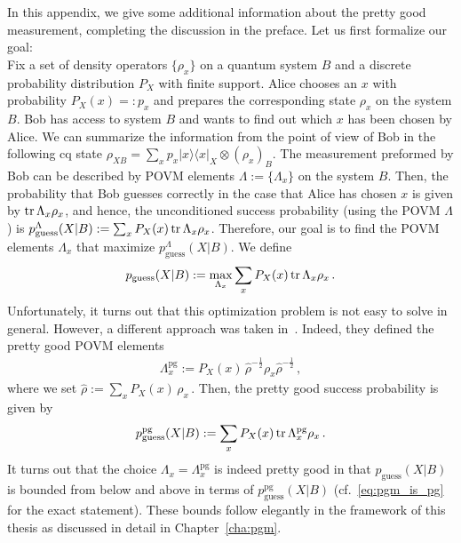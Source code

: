\documentclass[11pt,a4paper,twoside]{report}
\newcommand{\ketbra}[1]{|#1\rangle\langle #1|}
\newcommand{\+}{\textnormal{+} }
\def\tr{{\rm tr}}
\theoremstyle{definition}
\numberwithin{equation}{chapter}
\begin{document}
\begin{appendix}
In this appendix, we give some additional information about the pretty good measurement, completing the discussion in the preface. Let us first formalize our goal: \\
Fix a set of density operators $\{\rho_x\}$ on a quantum system $B$ and a discrete probability distribution $P_X$ with finite support. Alice chooses an $x$ with probability  $P_X(x)=:p_x$ and prepares the corresponding state $\rho_x$ on the system $B$. Bob has access to system $B$ and wants to find out which $x$ has been chosen by Alice. We can summarize the information from the point of view of Bob in the following cq state $\rho_{XB}=\sum_{x} p_x \ketbra{x}_X \otimes (\rho_x)_B$. The measurement preformed by Bob can be described by POVM elements $\Lambda:=\{\Lambda_x\}$ on the system $B$. Then, the probability that Bob guesses correctly in the case that Alice has chosen $x$ is given by $\tr \, \Lambda_x \rho_x$, and hence, the unconditioned success probability (using the POVM $\Lambda$) is $p^{\Lambda}_{\text{guess}}(X|B):=\sum_{x} P_X(x) \, \tr \, \Lambda_x \rho_x$. Therefore, our goal is to find the POVM elements $\Lambda_x$ that maximize $p^{\Lambda}_{\text{guess}}(X|B)$. We define
\begin{align}
p_{\text{guess}}(X|B):= \underset{\Lambda_x}{\max} \sum_{x} P_X(x) \, \tr \, \Lambda_x \rho_x \,.
\end{align}
Unfortunately, it turns out that this optimization problem is not easy to solve in general. However, a different approach was taken in~\cite{belavkin_optimal_1975, hausladen_`pretty_1994}. Indeed,  they defined the pretty good POVM elements 
\begin{align}
\Lambda^{\text{pg}}_x:=P_X(x) \, \hat{\rho}^{-\frac{1}{2}} \rho_x \hat{\rho}^{-\frac{1}{2}} \, ,
\end{align}
where we set $ \hat{\rho}:= \sum_{x} P_X(x) \, \rho_x\,$. Then, the pretty good success probability is given by 
\begin{align}
p^{\text{pg}}_{\text{guess}}(X|B):=\sum_{x} P_X(x) \, \tr \, \Lambda^{\text{pg}}_x \rho_x \, .  
\end{align}
It turns out that the choice $\Lambda_x=\Lambda^{\text{pg}}_x$ is indeed pretty good in that $p_{\text{guess}}(X|B)$ is bounded from below and above in terms of $p^{\text{pg}}_{\text{guess}}(X|B)$ (cf.~\eqref{eq:pgm_is_pg} for the exact statement). These bounds follow elegantly in the framework of this thesis as discussed in detail in Chapter~\ref{cha:pgm}.



\end{appendix}
\end{document}
